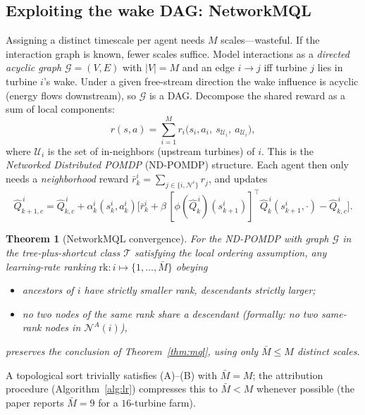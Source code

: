 \documentclass[11pt]{article}
\theoremstyle{plain}
\newtheorem{theorem}{Theorem}
\theoremstyle{definition}
\newcommand{\calN}{\mathcal{N}}
\newcommand{\calG}{\mathcal{G}}
\newcommand{\Qhat}{\hat{Q}}
\begin{document}
\subsection{Exploiting the wake DAG: NetworkMQL}

Assigning a distinct timescale per agent needs $M$ scales---wasteful. If the
interaction graph is known, fewer scales suffice. Model interactions as a
\emph{directed acyclic graph} $\calG=(V,E)$ with $|V|=M$ and an edge
$i\to j$ iff turbine $j$ lies in turbine $i$'s wake. Under a given free-stream
direction the wake influence is acyclic (energy flows downstream), so $\calG$
is a DAG. Decompose the shared reward as a sum of local components:
\begin{equation}
  r(s,a) = \sum_{i=1}^{M} r_i\big(s_i,a_i,\ s_{\mathcal{U}_i},\ a_{\mathcal{U}_i}\big),
  \label{eq:rewarddecomp}
\end{equation}
where $\mathcal{U}_i$ is the set of in-neighbors (upstream turbines) of $i$.
This is the \emph{Networked Distributed POMDP} (ND-POMDP) structure. Each agent
then only needs a \emph{neighborhood} reward
$\bar r^i_k = \sum_{j\in\{i,\calN^i\}} r_j$, and updates
\begin{equation}
  \Qhat^{\,i}_{k+1,c}
  = \Qhat^{\,i}_{k,c}
  + \alpha^i_k(s^i_k,a^i_k)\Big[\bar r^i_k
     + \beta\,[\phi(\Qhat^{\,i}_k)(s^i_{k+1})]^{\top}\Qhat^{\,i}_k(s^i_{k+1},\cdot)
     - \Qhat^{\,i}_{k,c}\Big].
  \label{eq:networkmql}
\end{equation}

\begin{theorem}[NetworkMQL convergence]
\label{thm:networkmql}
For the ND-POMDP with graph $\calG$ in the tree-plus-shortcut class $\mathcal T$
satisfying the local ordering assumption, any learning-rate ranking
$\mathrm{rk}:i\mapsto\{1,\dots,\bar M\}$ obeying
\begin{itemize}[leftmargin=1.4em,itemsep=0pt]
  \item[\textbf{(A)}] ancestors of $i$ have strictly smaller rank, descendants
  strictly larger;
  \item[\textbf{(B)}] no two nodes of the same rank share a descendant
  (formally: no two same-rank nodes in $\calN^A(i)$),
\end{itemize}
preserves the conclusion of Theorem~\ref{thm:mql}, using only
$\bar M\le M$ distinct scales.
\end{theorem}

\noindent A topological sort trivially satisfies (A)--(B) with $\bar M=M$; the
attribution procedure (Algorithm~\ref{alg:lr}) compresses this to $\bar M<M$
whenever possible (the paper reports $\bar M=9$ for a $16$-turbine farm).
\end{document}

